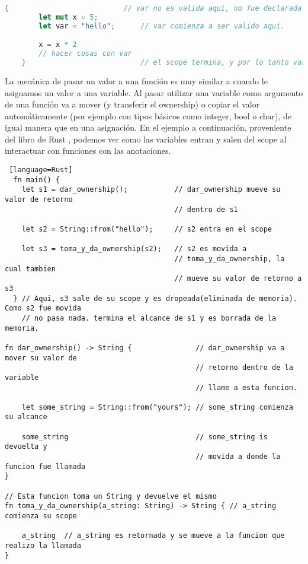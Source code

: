 \begin{lstlisting}[language=Rust]
    {                           // var no es valida aqui, no fue declarada todavia
        let mut x = 5;
        let var = "hello";      // var comienza a ser valido aqui.

        x = x * 2
        // hacer cosas con var
    }                           // el scope termina, y por lo tanto var no es mas valida
\end{lstlisting}


La mecánica de pasar un valor a una función es muy similar a cuando le asignamos un valor a una variable. Al pasar utilizar una variable como argumento de una función va a mover (y transferir el ownership) o copiar el valor automáticamente (por ejemplo con tipos básicos como integer, bool o char), de igual manera que en una asignación. En el ejemplo a continuación, proveniente del libro de Rust \citep{rustbook}, podemos ver como  las variables entran y salen del scope al interactuar con funciones con las anotaciones.

\begin{lstlisting} [language=Rust]
  fn main() {
    let s1 = dar_ownership();           // dar_ownership mueve su valor de retorno
                                        // dentro de s1

    let s2 = String::from("hello");     // s2 entra en el scope

    let s3 = toma_y_da_ownership(s2);   // s2 es movida a
                                        // toma_y_da_ownership, la cual tambien
                                        // mueve su valor de retorno a s3
  } // Aqui, s3 sale de su scope y es dropeada(eliminada de memoria). Como s2 fue movida
    // no pasa nada. termina el alcance de s1 y es borrada de la memoria.

fn dar_ownership() -> String {               // dar_ownership va a mover su valor de
                                             // retorno dentro de la variable
                                             // llame a esta funcion.

    let some_string = String::from("yours"); // some_string comienza su alcance

    some_string                              // some_string is devuelta y
                                             // movida a donde la funcion fue llamada
}

// Esta funcion toma un String y devuelve el mismo
fn toma_y_da_ownership(a_string: String) -> String { // a_string comienza su scope

    a_string  // a_string es retornada y se mueve a la funcion que realizo la llamada
}
\end{lstlisting}

